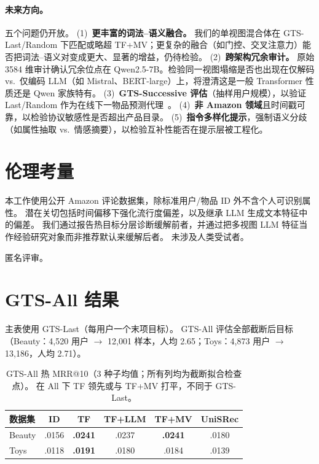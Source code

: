 \documentclass[sigconf,natbib=true,anonymous]{acmart}
\newcommand{\tfmv}{\textsc{TF+MV}\xspace}
\begin{document}
\paragraph{未来方向。}
五个问题仍开放。
(1)~\textbf{更丰富的词法--语义融合。} 我们的单视图混合体在 GTS-Last/Random 下匹配或略超 \tfmv；更复杂的融合（如门控、交叉注意力）能否把词法--语义对变成更大、显著的增益，仍待检验。
(2)~\textbf{跨架构冗余审计。} 原始 3584 维审计确认冗余位点在 Qwen2.5-7B。检验同一视图塌缩是否也出现在仅解码 vs.\ 仅编码 LLM（如 Mistral、BERT-large）上，将澄清这是一般 Transformer 性质还是 Qwen 家族特有。
(3)~\textbf{GTS-Successive 评估}（抽样用户规模），以验证 Last/Random 作为在线下一物品预测代理~\cite{gusak2025time}。
(4)~\textbf{非 Amazon 领域}且时间戳可靠，以检验协议敏感性是否超出产品目录。
(5)~\textbf{指令多样化提示}，强制语义分歧（如属性抽取 vs.\ 情感摘要），以检验互补性能否在提示层被工程化。

\section*{伦理考量}
本工作使用公开 Amazon 评论数据集，除标准用户/物品 ID 外不含个人可识别属性。
潜在关切包括时间偏移下强化流行度偏差，以及继承 LLM 生成文本特征中的偏差。
我们通过报告热目标分层诊断缓解前者，并通过把多视图 LLM 特征当作经验研究对象而非推荐默认来缓解后者。
未涉及人类受试者。

\begin{acks}
匿名评审。
\end{acks}

\appendix

\section{GTS-All 结果}
\label{app:gts-all}

主表使用 GTS-Last（每用户一个末项目标）。
GTS-All 评估全部截断后目标（Beauty：4{,}520 用户 $\to$ 12{,}001 样本，人均 2.65；Toys：4{,}873 用户 $\to$ 13{,}186，人均 2.71）。

\begin{table}[h]
\centering
\caption{GTS-All 热 MRR@10（3 种子均值；所有列均为截断拟合检查点）。
在 All 下 TF 领先或与 \tfmv 打平，不同于 GTS-Last。}
\label{tab:gts-all}
\small
\begin{tabular}{@{}lccccc@{}}
\toprule
数据集 & ID & TF & TF+LLM & TF+MV & UniSRec \\
\midrule
Beauty & .0156 & \textbf{.0241} & .0237 & \textbf{.0241} & .0180 \\
Toys   & .0118 & \textbf{.0191} & .0180 & .0184 & .0139 \\
\bottomrule
\end{tabular}
\end{table}
\end{document}
